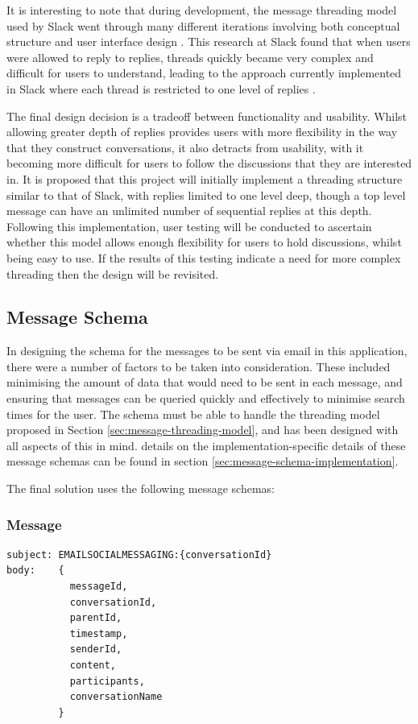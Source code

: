 It is interesting to note that during development, the message threading model used by Slack went through many different iterations involving both conceptual structure and user interface design \cite{florin2018}. This research at Slack found that when users were allowed to reply to replies, threads quickly became very complex and difficult for users to understand, leading to the approach currently implemented in Slack where each thread is restricted to one level of replies \cite{florin2018}.

The final design decision is a tradeoff between functionality and usability. Whilst allowing greater depth of replies provides users with more flexibility in the way that they construct conversations, it also detracts from usability, with it becoming more difficult for users to follow the discussions that they are interested in. It is proposed that this project will initially implement a threading structure similar to that of Slack, with replies limited to one level deep, though a top level message can have an unlimited number of sequential replies at this depth. Following this implementation, user testing will be conducted to ascertain whether this model allows enough flexibility for users to hold discussions, whilst being easy to use. If the results of this testing indicate a need for more complex threading then the design will be revisited.

\subsection{Message Schema} \label{sec:message-schemas}
In designing the schema for the messages to be sent via email in this application, there were a number of factors to be taken into consideration. These included minimising the amount of data that would need to be sent in each message, and ensuring that messages can be queried quickly and effectively to minimise search times for the user. The schema must be able to handle the threading model proposed in Section \ref{sec:message-threading-model}, and has been designed with all aspects of this in mind. details on the implementation-specific details of these message schemas can be found in section \ref{sec:message-schema-implementation}.

The final solution uses the following message schemas:

\subsubsection{Message}
\begin{verbatim}
subject: EMAILSOCIALMESSAGING:{conversationId}
body:    {
           messageId,
           conversationId,
           parentId,
           timestamp,
           senderId,
           content,
           participants,
           conversationName
         }
\end{verbatim}

